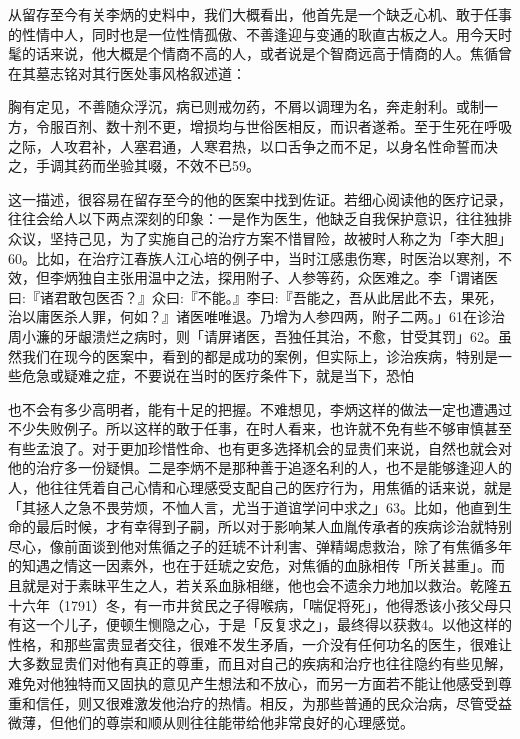 从留存至今有关李炳的史料中，我们大概看出，他首先是一个缺乏心机、敢于任事的性情中人，同时也是一位性情孤傲、不善逢迎与变通的耿直古板之人。用今天时髦的话来说，他大概是个情商不高的人，或者说是个智商远高于情商的人。焦循曾在其墓志铭对其行医处事风格叙述道：

\begin{BookQuote}
胸有定见，不善随众浮沉，病已则戒勿药，不屑以调理为名，奔走射利。或制一方，令服百剂、数十剂不更，增损均与世俗医相反，而识者遂希。至于生死在呼吸之际，人攻君补，人塞君通，人寒君热，以口舌争之而不足，以身名性命誓而决之，手调其药而坐验其啜，不效不已59。
\end{BookQuote}

这一描述，很容易在留存至今的他的医案中找到佐证。若细心阅读他的医疗记录，往往会给人以下两点深刻的印象：一是作为医生，他缺乏自我保护意识，往往独排众议，坚持己见，为了实施自己的治疗方案不惜冒险，故被时人称之为「李大胆」60。比如，在治疗江春族人江心培的例子中，当时江感患伤寒，时医治以寒剂，不效，但李炳独自主张用温中之法，探用附子、人参等药，众医难之。李「谓诸医曰:『诸君敢包医否？』众曰:『不能。』李曰:『吾能之，吾从此居此不去，果死，治以庸医杀人罪，何如？』诸医唯唯退。乃增为人参四两，附子二两。」61在诊治周小濂的牙龈溃烂之病时，则「请屏诸医，吾独任其治，不愈，甘受其罚」62。虽然我们在现今的医案中，看到的都是成功的案例，但实际上，诊治疾病，特别是一些危急或疑难之症，不要说在当时的医疗条件下，就是当下，恐怕

\vfill
\begin{BookNotes}
\end{BookNotes}

\noindent 也不会有多少高明者，能有十足的把握。不难想见，李炳这样的做法一定也遭遇过不少失败例子。所以这样的敢于任事，在时人看来，也许就不免有些不够审慎甚至有些孟浪了。对于更加珍惜性命、也有更多选择机会的显贵们来说，自然也就会对他的治疗多一份疑惧。二是李炳不是那种善于追逐名利的人，也不是能够逢迎人的人，他往往凭着自己心情和心理感受支配自己的医疗行为，用焦循的话来说，就是「其拯人之急不畏劳烦，不恤人言，尤当于道谊学问中求之」63。比如，他直到生命的最后时候，才有幸得到子嗣，所以对于影响某人血胤传承者的疾病诊治就特别尽心，像前面谈到他对焦循之子的廷琥不计利害、弹精竭虑救治，除了有焦循多年的知遇之情这一因素外，也在于廷琥之安危，对焦循的血脉相传「所关甚重」。而且就是对于素昧平生之人，若关系血脉相继，他也会不遗余力地加以救治。乾隆五十六年（1791）冬，有一市井贫民之子得喉病，「喘促将死」，他得悉该小孩父母只有这一个儿子，便顿生恻隐之心，于是「反复求之」，最终得以获救4。以他这样的性格，和那些富贵显者交往，很难不发生矛盾，一介没有任何功名的医生，很难让大多数显贵们对他有真正的尊重，而且对自己的疾病和治疗也往往隐约有些见解，难免对他独特而又固执的意见产生想法和不放心，而另一方面若不能让他感受到尊重和信任，则又很难激发他治疗的热情。相反，为那些普通的民众治病，尽管受益微薄，但他们的尊崇和顺从则往往能带给他非常良好的心理感觉。


